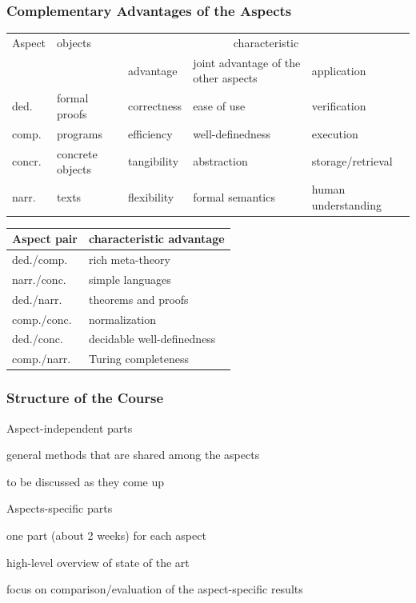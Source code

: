 \documentclass{beamer}
\begin{document}
\begin{frame}\frametitle{Complementary Advantages of the Aspects}
\begin{center}
\footnotesize
\begin{tabular}{|l|llp{2.1cm}l|}\hline
Aspect & objects & \multicolumn{3}{c|}{characteristic} \\
       &         & advantage & joint advantage of the other aspects & application \\\hline
ded. & formal proofs & correctness & ease of use & verification \\
comp. & programs & efficiency & well-definedness & execution\\
concr. & concrete objects & tangibility & abstraction & storage/retrieval\\
narr. & texts & flexibility & formal semantics & human understanding\\\hline
\end{tabular}
\medskip

\begin{tabular}{|l|l|}\hline
Aspect pair & characteristic advantage \\\hline
ded./comp.  & rich meta-theory \\
narr./conc. & simple languages \\\hline
ded./narr.  & theorems and proofs \\
comp./conc. & normalization \\\hline
ded./conc.  & decidable well-definedness \\
comp./narr. & Turing completeness \\\hline
\end{tabular}
\end{center}
\end{frame}

\begin{frame}\frametitle{Structure of the Course}
\begin{blockitems}{Aspect-independent parts}
\item general methods that are shared among the aspects
\item to be discussed as they come up
\end{blockitems}

\begin{blockitems}{Aspects-specific parts}
\item one part (about 2 weeks) for each aspect
\item high-level overview of state of the art
\item focus on comparison/evaluation of the aspect-specific results
\end{blockitems}
\end{frame}
\end{document}
